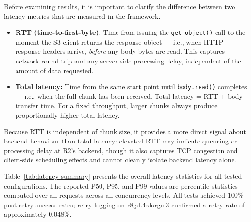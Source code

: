 Before examining results, it is important to clarify the difference between two latency metrics that are measured in the framework. 

\begin{itemize}
    \item \textbf{RTT (time-to-first-byte):} Time from issuing the \texttt{get\_object()} call to the moment the S3 client returns the response object --- i.e., when HTTP response headers arrive, \textit{before} any body bytes are read. This captures network round-trip and any server-side processing delay, independent of the amount of data requested.
    \item \textbf{Total latency:} Time from the same start point until \texttt{body.read()} completes --- i.e., when the full chunk has been received. Total latency = RTT + body transfer time. For a fixed throughput, larger chunks always produce proportionally higher total latency.
\end{itemize}

Because RTT is independent of chunk size, it provides a more direct signal about backend behaviour than total latency: elevated RTT may indicate queueing or processing delay at R2's backend, though it also captures TCP congestion and client-side scheduling effects and cannot cleanly isolate backend latency alone.

Table~\ref{tab:latency-summary} presents the overall latency statistics for all tested configurations. The reported P50, P95, and P99 values are percentile statistics computed over all requests across all concurrency levels. All tests achieved 100\% post-retry success rates; retry logging on r8gd.4xlarge-3 confirmed a retry rate of approximately 0.048\%.

